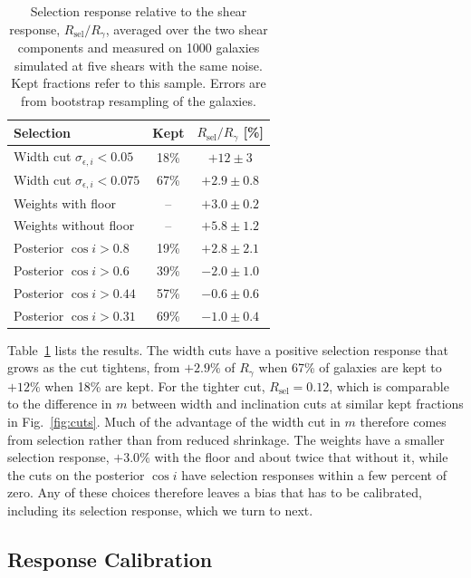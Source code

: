 \begin{table}
\centering
\caption{Selection response relative to the shear response, $R_\mathrm{sel}/R_\gamma$, averaged over the two shear components and measured on 1000 galaxies simulated at five shears with the same noise. Kept fractions refer to this sample. Errors are from bootstrap resampling of the galaxies.}
\label{tab:selection}
\begin{tabular}{lcc}
\toprule
Selection & Kept & $R_\mathrm{sel}/R_\gamma$ [\%] \\
\midrule
Width cut $\sigma_{\epsilon,i} < 0.05$ & 18\% & $+12 \pm 3$ \\
Width cut $\sigma_{\epsilon,i} < 0.075$ & 67\% & $+2.9 \pm 0.8$ \\
Weights with floor & -- & $+3.0 \pm 0.2$ \\
Weights without floor & -- & $+5.8 \pm 1.2$ \\
Posterior $\cos i > 0.8$ & 19\% & $+2.8 \pm 2.1$ \\
Posterior $\cos i > 0.6$ & 39\% & $-2.0 \pm 1.0$ \\
Posterior $\cos i > 0.44$ & 57\% & $-0.6 \pm 0.6$ \\
Posterior $\cos i > 0.31$ & 69\% & $-1.0 \pm 0.4$ \\
\bottomrule
\end{tabular}
\end{table}

Table~\ref{tab:selection} lists the results. The width cuts have a positive selection response that grows as the cut tightens, from $+2.9\%$ of $R_\gamma$ when 67\% of galaxies are kept to $+12\%$ when 18\% are kept. For the tighter cut, $R_\mathrm{sel} = 0.12$, which is comparable to the difference in $m$ between width and inclination cuts at similar kept fractions in Fig.~\ref{fig:cuts}. Much of the advantage of the width cut in $m$ therefore comes from selection rather than from reduced shrinkage. The weights have a smaller selection response, $+3.0\%$ with the floor and about twice that without it, while the cuts on the posterior $\cos i$ have selection responses within a few percent of zero. Any of these choices therefore leaves a bias that has to be calibrated, including its selection response, which we turn to next.

\subsection{Response Calibration}
\label{ssec:response}

